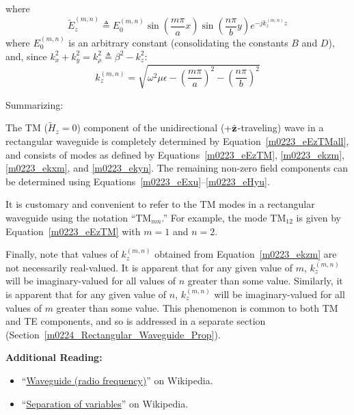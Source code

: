 %
where
\begin{equation}
\widetilde{E}_z^{(m,n)} \triangleq E_0^{(m,n)} \sin\left(\frac{m\pi}{a} x\right) \sin\left(\frac{n\pi}{b} y\right) e^{-jk_z^{(m,n)} z} \label{m0223_eEzTM}
\end{equation}
%
where 
$E_0^{(m,n)}$ is an arbitrary constant (consolidating the constants $B$ and $D$), 
and,
since $k_x^2 + k_y^2 = k_{\rho}^2 \triangleq \beta^2-k_z^2$:
% 
\begin{equation}
k_z^{(m,n)} = \sqrt{ \omega^2\mu\epsilon - \left(\frac{m\pi}{a}\right)^2 - \left(\frac{n\pi}{b}\right)^2   } \label{m0223_ekzm}
\end{equation}

Summarizing:
%
\begin{mdframed}[backgroundcolor=yellow!20,nobreak=true] 
The TM ($\widetilde{H}_z=0$) component of the unidirectional ($+\hat{\bf z}$-traveling) wave in a rectangular waveguide is completely determined by Equation~\ref{m0223_eEzTMall}, and consists of modes as defined by Equations~\ref{m0223_eEzTM}, \ref{m0223_ekzm}, \ref{m0223_ekxm}, and \ref{m0223_ekyn}.  The remaining non-zero field components can be determined using Equations~\ref{m0223_eExu}--\ref{m0223_eHyu}.
\end{mdframed}

It is customary and convenient to refer to the TM modes in a rectangular waveguide using the notation ``TM$_{mn}$.''
For example, the mode TM$_{12}$ is given by Equation~\ref {m0223_eEzTM} with $m=1$ and $n=2$.

Finally, note that values of $k_z^{(m,n)}$ obtained from Equation~\ref{m0223_ekzm} are not necessarily real-valued.  
It is apparent that for any given value of $m$, $k_z^{(m,n)}$ will be imaginary-valued for all values of $n$ greater than some value.
Similarly, 
it is apparent that for any given value of $n$, $k_z^{(m,n)}$ will be imaginary-valued for all values of $m$ greater than some value.
This phenomenon is common to both TM and TE components, and so is addressed in a separate section (Section~\ref{m0224_Rectangular_Waveguide_Prop}).


{\bf Additional Reading:}
\begin{itemize}
\item ``\href{https://en.wikipedia.org/wiki/Waveguide_(radio_frequency)}{Waveguide (radio frequency)}'' on Wikipedia.
\item ``\href{https://en.wikipedia.org/wiki/Separation_of_variables}{Separation of variables}'' on Wikipedia.
\end{itemize}



